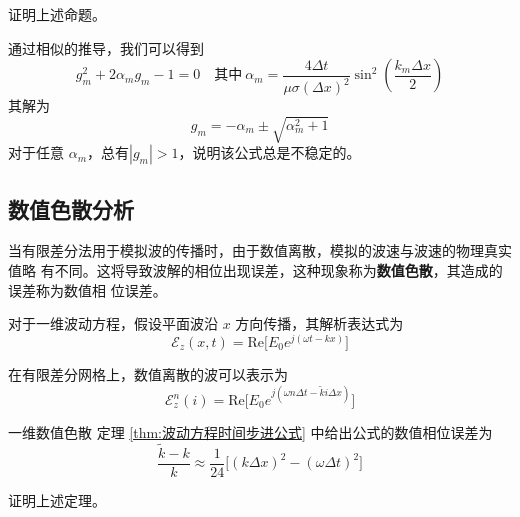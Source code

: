 \begin{exercise}
    证明上述命题。
\end{exercise}

\begin{solution}
    通过相似的推导，我们可以得到
    \begin{equation*}
        g_m^2+2\alpha_m g_m-1=0 \quad \text{其中} 
        \ \alpha_m=\frac{4\Delta t}{\mu \sigma (\Delta x)^2} \sin^2\left(\frac{k_m \Delta x}{2}\right)  
    \end{equation*}
    其解为
    \begin{equation*}
        g_m=-\alpha_m \pm \sqrt{\alpha_m^2+1}
    \end{equation*}
    对于任意 $\alpha_m$，总有$|g_m|>1$，说明该公式总是不稳定的。
\end{solution}

\subsection{数值色散分析}

\par 当有限差分法用于模拟波的传播时，由于数值离散，模拟的波速与波速的物理真实值略
有不同。这将导致波解的相位出现误差，这种现象称为\textbf{数值色散}，其造成的误差称为数值相
位误差。

\par 对于一维波动方程，假设平面波沿 $x$ 方向传播，其解析表达式为
\begin{equation}
    \mathscr{E}_z(x,t)=\text{Re}\Big[E_0e^{j(\omega t-kx)}\Big]
\end{equation}
\par 在有限差分网格上，数值离散的波可以表示为
\begin{equation}
    \mathscr{E}^n_z(i)=\text{Re}\Big[E_0e^{j(\omega n \Delta t-\tilde{k} i\Delta x)}\Big]
    \label{数值波解}
\end{equation}

\begin{theorem}{一维数值色散}
    定理 \ref{thm:波动方程时间步进公式} 中给出公式的数值相位误差为
    \begin{equation}
        \frac{\tilde{k}-k}{k}
        \approx\frac{1}{24}\Big[(k\Delta x)^2-(\omega \Delta t)^2\Big]
    \end{equation}
\end{theorem}

\begin{exercise}
    证明上述定理。
\end{exercise}

